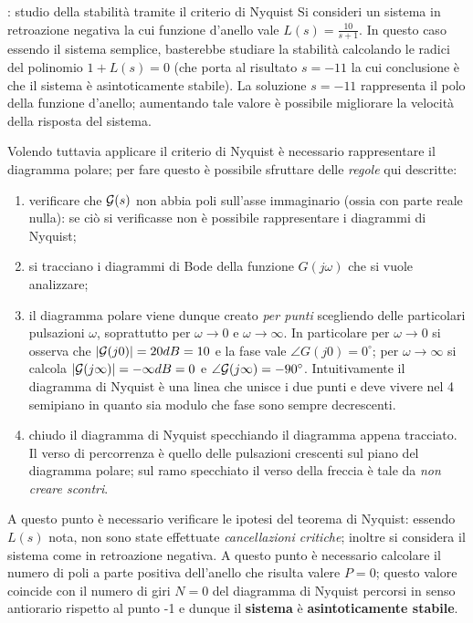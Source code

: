 		 
		\begin{esempio}{: studio della stabilità tramite il criterio di Nyquist}
			Si consideri un sistema in retroazione negativa la cui funzione d'anello vale  $L(s) = \frac{10}{s+1}$. In questo caso essendo il sistema semplice, basterebbe studiare la stabilità calcolando le radici del polinomio $1 + L(s) = 0$ (che porta al risultato $s=-11$ la cui conclusione è che il sistema è asintoticamente stabile). La soluzione $s=-11$ rappresenta il polo della funzione d'anello; aumentando tale valore è possibile migliorare la velocità della risposta del sistema.
			
			Volendo tuttavia applicare il criterio di Nyquist è necessario rappresentare il diagramma polare; per fare questo è possibile sfruttare delle \textit{regole} qui descritte:
			\begin{enumerate}
				\item verificare che $\mathcal G(s)$ non abbia poli sull'asse immaginario (ossia con parte reale nulla): se ciò si verificasse non è possibile rappresentare i diagrammi di Nyquist;
				\item si tracciano i diagrammi di Bode della funzione $G(j\omega)$ che si vuole analizzare;
				\item il diagramma polare viene dunque creato \textit{per punti} scegliendo delle particolari pulsazioni $\omega$, soprattutto per $\omega\rightarrow 0$ e $\omega\rightarrow \infty$. In particolare per $\omega\rightarrow 0$ si osserva che $|\mathcal G(j0)| = 20dB = 10$ e la fase vale $\angle G(j0) = 0^\circ$; per $\omega \rightarrow \infty$ si calcola $|\mathcal G(j\infty)| = -\infty dB = 0$ e $\angle \mathcal G(j\infty) = -90^\circ$. Intuitivamente il diagramma di Nyquist è una linea che unisce i due punti e deve vivere nel 4 semipiano in quanto sia modulo che fase sono sempre decrescenti.
				\item chiudo il diagramma di Nyquist specchiando il diagramma appena tracciato. Il verso di percorrenza è quello delle pulsazioni crescenti sul piano del diagramma polare; sul ramo specchiato il verso della freccia è tale da \textit{non creare scontri}.
			\end{enumerate}
			
			A questo punto è necessario verificare le ipotesi del teorema di Nyquist: essendo $L(s)$ nota, non sono state effettuate \textit{cancellazioni critiche}; inoltre si considera il sistema come in retroazione negativa. A questo punto è necessario calcolare il numero di poli a parte positiva dell'anello che risulta valere $P=0$; questo valore coincide con il numero di giri $N=0$ del diagramma di Nyquist percorsi in senso antiorario rispetto al punto -1 e dunque il \textbf{sistema} è \textbf{asintoticamente stabile}.
		
		\end{esempio}
		
